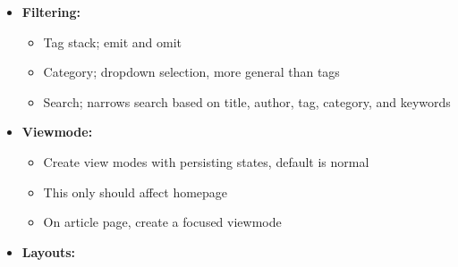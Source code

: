 \documentclass[7px]{article}
\begin{document}
{
  \begin{itemize}[label=\textsection]
    \item {\textbf{Filtering:}}
      \small
      \begin{itemize}[label=$\multimapdotinv$, leftmargin=3mm]
        \item Tag stack; emit and omit
        \item Category; dropdown selection, more general than tags
        \item Search; narrows search based on title, author, tag, category, and keywords
      \end{itemize}
      \normalsize
    \item \textbf{Viewmode:}
      \small 
      \begin{itemize}[label=$\multimapdotinv$, leftmargin=3mm]
        \item Create view modes with persisting states, default is normal 
        \item This only should affect homepage
        \item On article page, create a focused viewmode
      \end{itemize}
      \normalsize
    \item \textbf{Layouts: }
      \small
      \begin{itemize}[label=$\multimapdotinv$, leftmargin=3mm]

\end{itemize}
\end{itemize}}
\end{document}
